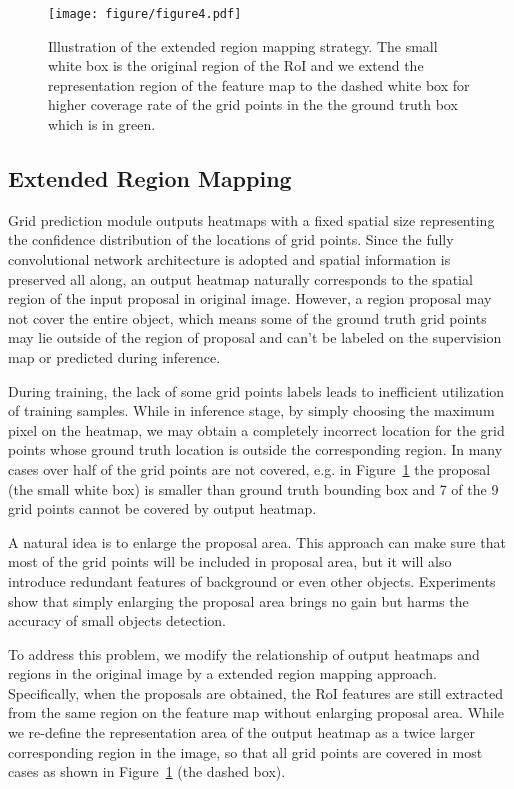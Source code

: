 \documentclass[10pt,twocolumn,letterpaper]{article}
\begin{document}
\begin{figure}[t]
\centering
\texttt{[image: figure/figure4.pdf]}
\caption{Illustration of the extended region mapping strategy. The small white box is the original region of the RoI and we extend the representation region of the feature map to the dashed white box for higher coverage rate of the grid points in the the ground truth box which is in green.}
\label{fig:extend}
\end{figure}


\subsection{Extended Region Mapping}
\label{sec:cmapping}
Grid prediction module outputs heatmaps with a fixed spatial size representing the confidence distribution of the locations of grid points. Since the fully convolutional network architecture is adopted and spatial information is preserved all along, an output heatmap naturally corresponds to the spatial region of the input proposal in original image. However, a region proposal may not cover the entire object, which means some of the ground truth grid points may lie outside of the region of proposal and can't be labeled on the supervision map or predicted during inference. 

During training, the lack of some grid points labels leads to inefficient utilization of training samples. While in inference stage, by simply choosing the maximum pixel on the heatmap, we may obtain a completely incorrect location for the grid points whose ground truth location is outside the corresponding region. In many cases over half of the grid points are not covered, e.g. in Figure~\ref{fig:extend} the proposal (the small white box) is smaller than ground truth bounding box and 7 of the 9 grid points cannot be covered by output heatmap.

A natural idea is to enlarge the proposal area. This approach can make sure that most of the grid points will be included in proposal area, but it will also introduce redundant features of background or even other objects. Experiments show that simply enlarging the proposal area brings no gain but harms the accuracy of small objects detection.

To address this problem, we modify the relationship of output heatmaps and regions in the original image by a extended region mapping approach. Specifically, when the proposals are obtained, the RoI features are still extracted from the same region on the feature map without enlarging proposal area. While we re-define the representation area of the output heatmap as a twice larger corresponding region in the image, so that all grid points are covered in most cases as shown in Figure~\ref{fig:extend} (the dashed box). 
\end{document}
